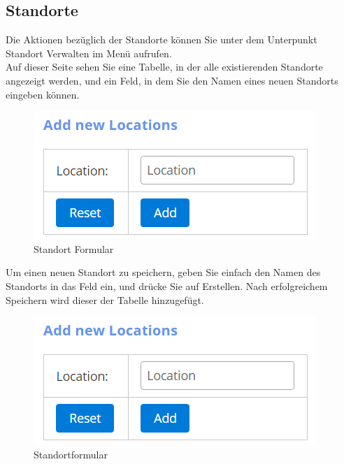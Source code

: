 \documentclass[enabledeprecatedfontcommands,fontsize=12pt,paper=a4,twoside]{scrartcl}
\begin{document}

\subsection{Standorte}
Die Aktionen bezüglich der Standorte können Sie unter dem Unterpunkt Standort Verwalten im Menü aufrufen. \\
Auf dieser Seite sehen Sie eine Tabelle, in der alle existierenden Standorte angezeigt werden, und ein Feld, in dem Sie den Namen eines neuen Standorts eingeben können. \\

\begin{figure}[h!]
\begin{center}
 \includegraphics[width=\textwidth]{screenshots/admin/standortformular.png}
  \caption{Standort Formular}
  \label{fig:boat2}
\end{center}
\end{figure}

Um einen neuen Standort zu speichern, geben Sie einfach den Namen des Standorts in das Feld ein, und drücke Sie auf Erstellen. Nach erfolgreichem Speichern wird dieser der Tabelle hinzugefügt. \\

\begin{figure}[h!]
\begin{center}
 \includegraphics[width=\textwidth]{screenshots/admin/standortformular.png}
  \caption{Standortformular}
  \label{fig:boat2}
\end{center}
\end{figure}
\end{document}
